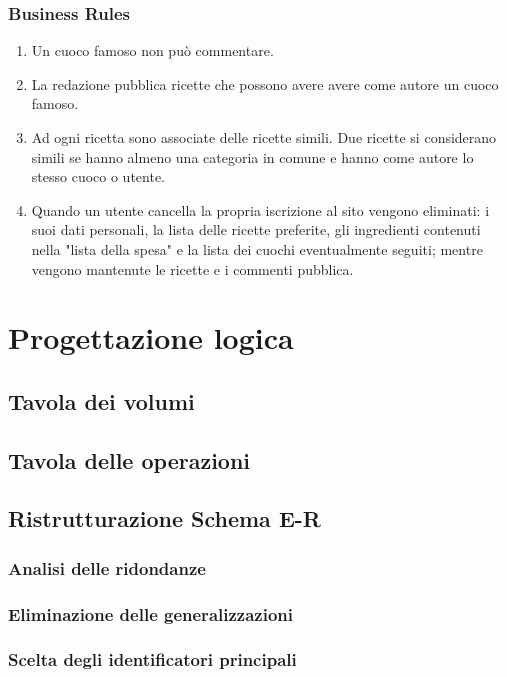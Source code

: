 \documentclass[12pt]{extarticle}
\begin{document}
\subsubsection{Business Rules}
\begin{enumerate}
    \item Un cuoco famoso non può commentare.
    \item La redazione pubblica ricette che possono avere avere come autore un cuoco famoso.
    \item Ad ogni ricetta sono associate delle ricette simili. Due ricette si considerano simili se hanno almeno una categoria in comune e hanno come autore lo stesso cuoco o utente.
    \item Quando un utente cancella la propria iscrizione al sito vengono eliminati: i suoi dati personali, la lista delle ricette preferite, gli ingredienti contenuti nella "lista della spesa" e la lista dei cuochi eventualmente seguiti; mentre vengono mantenute le ricette e i commenti pubblica.
\end{enumerate}


\section{Progettazione logica}
\subsection{Tavola dei volumi}

\subsection{Tavola delle operazioni}

\subsection{Ristrutturazione Schema E-R}
\subsubsection{Analisi delle ridondanze}
\subsubsection{Eliminazione delle generalizzazioni}
\subsubsection{Scelta degli identificatori principali}
\end{document}
